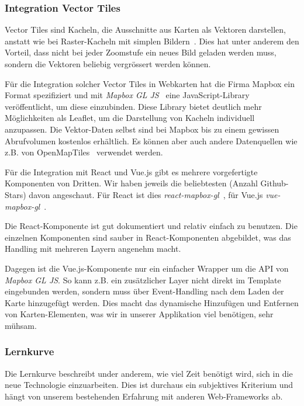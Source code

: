 \subsubsection{Integration Vector Tiles}
\label{Analyse Framework:Integration Vector Tiles}

Vector Tiles sind Kacheln, die Ausschnitte aus Karten als Vektoren darstellen, anstatt wie bei Raster-Kacheln mit simplen Bildern~\cite{geometalab_vectortiles}.
Dies hat unter anderem den Vorteil, dass nicht bei jeder Zoomstufe ein neues Bild geladen werden muss, sondern die Vektoren beliebig vergrössert werden können.

Für die Integration solcher Vector Tiles in Webkarten hat die Firma Mapbox ein Format spezifiziert und mit \emph{Mapbox GL JS}~\cite{mapbox_gl_js} eine JavaScript-Library veröffentlicht, um diese einzubinden.
Diese Library bietet deutlich mehr Möglichkeiten als Leaflet, um die Darstellung von Kacheln individuell anzupassen.
Die Vektor-Daten selbst sind bei Mapbox bis zu einem gewissen Abrufvolumen kostenlos erhältlich.
Es können aber auch andere Datenquellen wie z.B. von OpenMapTiles~\cite{openmaptiles} verwendet werden.

Für die Integration mit React und Vue.js gibt es mehrere vorgefertigte Komponenten von Dritten.
Wir haben jeweils die beliebtesten (Anzahl Github-Stars) davon angeschaut.
Für React ist dies \emph{react-mapbox-gl}~\cite{react_mapbox_gl}, für Vue.js \emph{vue-mapbox-gl}~\cite{vue_mapbox_gl}.

Die React-Komponente ist gut dokumentiert und relativ einfach zu benutzen.
Die einzelnen Komponenten sind sauber in React-Komponenten abgebildet, was das Handling mit mehreren Layern angenehm macht.

Dagegen ist die Vue.js-Komponente nur ein einfacher Wrapper um die API von \emph{Mapbox GL JS}.
So kann z.B. ein zusätzlicher Layer nicht direkt im Template eingebunden werden, sondern muss über Event-Handling nach dem Laden der Karte hinzugefügt werden.
Dies macht das dynamische Hinzufügen und Entfernen von Karten-Elementen, was wir in unserer Applikation viel benötigen, sehr mühsam.

\subsubsection{Lernkurve}
\label{Analyse Framework:Lernkurve}

Die Lernkurve beschreibt under anderem, wie viel Zeit benötigt wird, sich in die neue Technologie einzuarbeiten.
Dies ist durchaus ein subjektives Kriterium und hängt von unserem bestehenden Erfahrung mit anderen Web-Frameworks ab.

